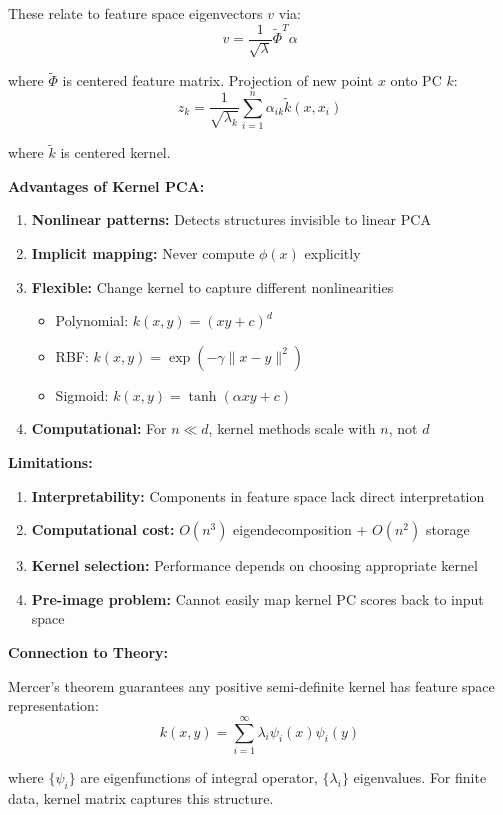 \documentclass[12pt]{article}
\begin{document}
\begin{explanation}
These relate to feature space eigenvectors $v$ via:
\[
v = \frac{1}{\sqrt{\lambda}} \tilde{\Phi}^T \alpha
\]

where $\tilde{\Phi}$ is centered feature matrix. Projection of new point $x$ onto PC $k$:
\[
z_k = \frac{1}{\sqrt{\lambda_k}} \sum_{i=1}^n \alpha_{ik} \tilde{k}(x, x_i)
\]

where $\tilde{k}$ is centered kernel.

\textbf{Advantages of Kernel PCA:}

\begin{enumerate}
    \item \textbf{Nonlinear patterns:} Detects structures invisible to linear PCA
    \item \textbf{Implicit mapping:} Never compute $\phi(x)$ explicitly
    \item \textbf{Flexible:} Change kernel to capture different nonlinearities
    \begin{itemize}
        \item Polynomial: $k(x,y) = (xy + c)^d$
        \item RBF: $k(x,y) = \exp(-\gamma\|x-y\|^2)$
        \item Sigmoid: $k(x,y) = \tanh(\alpha xy + c)$
    \end{itemize}
    \item \textbf{Computational:} For $n \ll d$, kernel methods scale with $n$, not $d$
\end{enumerate}

\textbf{Limitations:}

\begin{enumerate}
    \item \textbf{Interpretability:} Components in feature space lack direct interpretation
    \item \textbf{Computational cost:} $O(n^3)$ eigendecomposition + $O(n^2)$ storage
    \item \textbf{Kernel selection:} Performance depends on choosing appropriate kernel
    \item \textbf{Pre-image problem:} Cannot easily map kernel PC scores back to input space
\end{enumerate}

\textbf{Connection to Theory:}

Mercer's theorem guarantees any positive semi-definite kernel has feature space representation:
\[
k(x, y) = \sum_{i=1}^\infty \lambda_i \psi_i(x) \psi_i(y)
\]

where $\{\psi_i\}$ are eigenfunctions of integral operator, $\{\lambda_i\}$ eigenvalues. For finite data, kernel matrix captures this structure.

\end{explanation}
\end{document}
